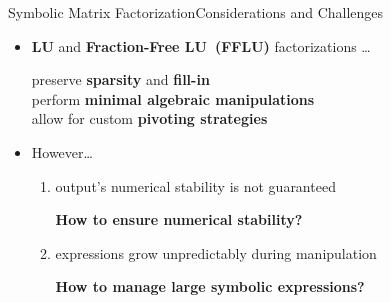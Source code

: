 \begin{frame}{Symbolic Matrix Factorization}{Considerations and Challenges}
  \begin{itemize}
    \item<2-> \textbf{\acs{LU}} and \textbf{Fraction-Free \acs{LU}~(\acs{FFLU})} factorizations \dots \\
    \begin{small}
      \qquad preserve \textbf{sparsity} and \textbf{fill-in} \\
      \qquad perform \textbf{minimal algebraic manipulations} \\
      \qquad allow for custom \textbf{pivoting strategies}
    \end{small}
  \item<3->However\dots
    \begin{enumerate}
      \normalsize
      \item output's numerical stability is not guaranteed \\
      \begin{small}
        \qquad \textbf{How to ensure numerical stability?}
      \end{small}
      \item expressions grow unpredictably during manipulation \\
      \begin{small}
        \qquad \textbf{How to manage large symbolic expressions?}
      \end{small}
    \end{enumerate}
  \end{itemize}
\end{frame}


